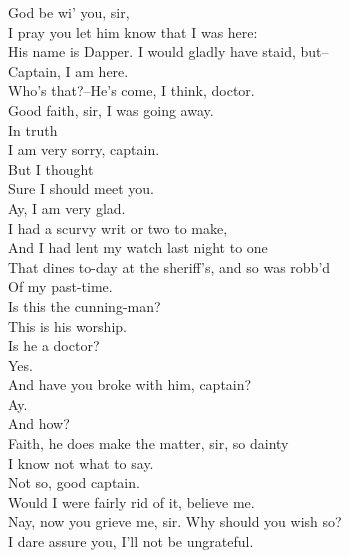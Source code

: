 \documentclass{memoir}
\begin{document}
\begin{drama*}
\facespeaks {} God be wi' you, sir,\\
 I pray you let him know that I was here:\\
 His name is Dapper. I would gladly have staid, but--\\
\dapperspeaks {} Captain, I am here.\\
\facespeaks  Who's that?--He's come, I think, doctor.\\
 Good faith, sir, I was going away.\\
\dapperspeaks {} In truth\\
 I am very sorry, captain.\\
\facespeaks {} But I thought\\
 Sure I should meet you.\\
\dapperspeaks {} Ay, I am very glad.\\
 I had a scurvy writ or two to make,\\
 And I had lent my watch last night to one\\
 That dines to-day at the sheriff's, and so was robb'd\\
 Of my past-time.\\
 Is this the cunning-man?\\
\facespeaks {} This is his worship.\\
\dapperspeaks  Is he a doctor?\\
\facespeaks {} Yes.\\
\dapperspeaks {} And have you broke with him, captain?\\
\facespeaks  Ay.\\
\dapperspeaks {} And how?\\
\facespeaks {} Faith, he does make the matter, sir, so dainty\\
 I know not what to say.\\
\dapperspeaks {} Not so, good captain.\\
\facespeaks  Would I were fairly rid of it, believe me.\\
\dapperspeaks  Nay, now you grieve me, sir. Why should you wish so?\\
 I dare assure you, I'll not be ungrateful.\\

\end{drama*}
\end{document}
